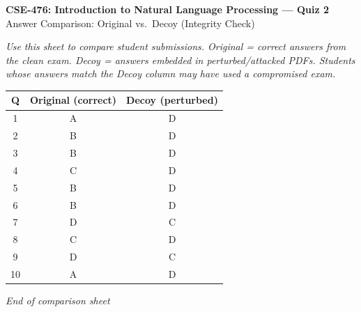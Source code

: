 \documentclass[12pt]{article}
\begin{document}
\begin{center}
\textbf{CSE-476: Introduction to Natural Language Processing --- Quiz 2} \\[0.5em]
Answer Comparison: Original vs.\ Decoy (Integrity Check)
\end{center}

\noindent\small\textit{Use this sheet to compare student submissions. Original = correct answers from the clean exam. Decoy = answers embedded in perturbed/attacked PDFs. Students whose answers match the Decoy column may have used a compromised exam.}

\vspace{1em}
\begin{center}
\begin{tabular}{|c|c|c|}
\hline
\textbf{Q} & \textbf{Original (correct)} & \textbf{Decoy (perturbed)} \\
\hline
1  & A & D \\
2  & B & D \\
3  & B & D \\
4  & C & D \\
5  & B & D \\
6  & B & D \\
7  & D & C \\
8  & C & D \\
9  & D & C \\
10 & A & D \\
\hline
\end{tabular}
\end{center}

\vspace{1em}
\noindent\textit{End of comparison sheet}
\end{document}

